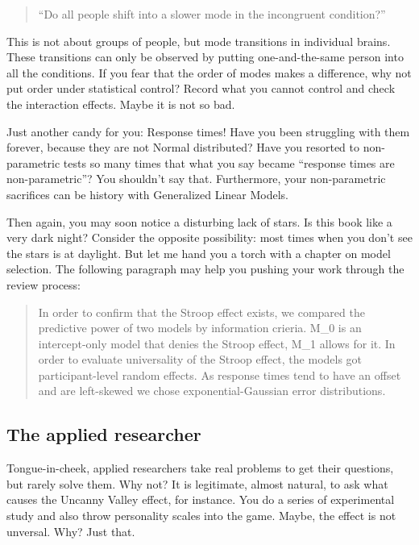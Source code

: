 \documentclass[]{svmono}
\begin{document}
\begin{quote}
``Do all people shift into a slower mode in the incongruent condition?''
\end{quote}

This is not about groups of people, but mode transitions in individual
brains. These transitions can only be observed by putting
one-and-the-same person into all the conditions. If you fear that the
order of modes makes a difference, why not put order under statistical
control? Record what you cannot control and check the interaction
effects. Maybe it is not so bad.

Just another candy for you: Response times! Have you been struggling
with them forever, because they are not Normal distributed? Have you
resorted to non-parametric tests so many times that what you say became
``response times are non-parametric''? You shouldn't say that.
Furthermore, your non-parametric sacrifices can be history with
Generalized Linear Models.

Then again, you may soon notice a disturbing lack of stars. Is this book
like a very dark night? Consider the opposite possibility: most times
when you don't see the stars is at daylight. But let me hand you a torch
with a chapter on model selection. The following paragraph may help you
pushing your work through the review process:

\begin{quote}
In order to confirm that the Stroop effect exists, we compared the
predictive power of two models by information crieria. M\_0 is an
intercept-only model that denies the Stroop effect, M\_1 allows for it.
In order to evaluate universality of the Stroop effect, the models got
participant-level random effects. As response times tend to have an
offset and are left-skewed we chose exponential-Gaussian error
distributions.
\end{quote}

\subsection{The applied researcher}\label{the-applied-researcher}

Tongue-in-cheek, applied researchers take real problems to get their
questions, but rarely solve them. Why not? It is legitimate, almost
natural, to ask what causes the Uncanny Valley effect, for instance. You
do a series of experimental study and also throw personality scales into
the game. Maybe, the effect is not unversal. Why? Just that.
\end{document}
